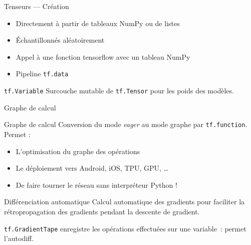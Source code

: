 \begin{frame}{Tenseurs --- Création}
  \begin{itemize}[<+->]
    \item Directement à partir de tableaux NumPy ou de listes
    \item Échantillonnés aléatoirement
    \item Appel à une fonction tensorflow avec un tableau NumPy
    \item Pipeline \texttt{tf.data}
  \end{itemize}
\end{frame}

\begin{frame}{\texttt{tf.Variable}}
  Surcouche mutable de \texttt{tf.Tensor} pour les poids des modèles.
\end{frame}

\begin{frame}{Graphe de calcul}
\end{frame}

\begin{frame}{Graphe de calcul}
  Conversion du mode \textit{eager} au mode graphe par \texttt{tf.function}. Permet :

  \begin{itemize}[<+->]
    \item L'optimisation du graphe des opérations
    \item Le déploiement vers Android, iOS, TPU, GPU, …
    \item De faire tourner le réseau sans interpréteur Python !
  \end{itemize}
\end{frame}

\begin{frame}{Différenciation automatique}
  Calcul automatique des gradients pour faciliter la rétropropagation des gradients pendant la descente de gradient.

  \texttt{tf.GradientTape} enregistre les opérations effectuées sur une variable~: permet l'autodiff.
\end{frame}

